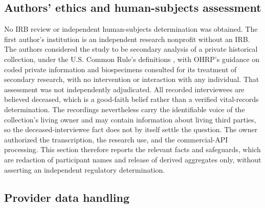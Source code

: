 \documentclass[11pt]{article}
\begin{document}
\subsection{Authors' ethics and human-subjects assessment}

No IRB review or independent human-subjects determination was obtained. The first author's institution is an independent research nonprofit without an IRB. The authors considered the study to be secondary analysis of a private historical collection, under the U.S. Common Rule's definitions \citep{hhs18}, with OHRP's guidance on coded private information and biospecimens \citep{ohrp18} consulted for its treatment of secondary research, with no intervention or interaction with any individual. That assessment was not independently adjudicated. All recorded interviewees are believed deceased, which is a good-faith belief rather than a verified vital-records determination. The recordings nevertheless carry the identifiable voice of the collection's living owner and may contain information about living third parties, so the deceased-interviewee fact does not by itself settle the question. The owner authorized the transcription, the research use, and the commercial-API processing. This section therefore reports the relevant facts and safeguards, which are redaction of participant names and release of derived aggregates only, without asserting an independent regulatory determination.

\subsection{Provider data handling}
\end{document}
